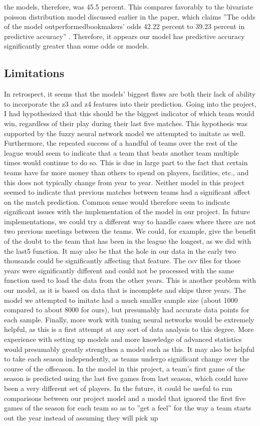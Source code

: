 \documentclass[sigconf]{acmart}
\begin{document}
the models, therefore, was 45.5 percent. This compares favorably to the bivariate poisson distribution model discussed earlier in the paper, which claims ''The odds of the model outperformedbookmakers’ odds 42.22 percent to 39.23 percent in predictive accuracy'' \cite{BivariateExpected}. Therefore, it appears our model has predictive accuracy significantly greater than some odds or models.

\subsection{Limitations}
In retrospect, it seems that the models' biggest flaws are both their lack of ability to incorporate the z3 and z4 features into their prediction. Going into the project, I had hypothesized that this should be the biggest indicator of which team would win, regardless of their play during their last five matches. This hypothesis was supported by the fuzzy neural network model we attempted to imitate as well. Furthermore, the repeated success of a handful of teams over the rest of the league would seem to indicate that a team that beats another team multiple times would continue to do so. This is due in large part to the fact that certain teams have far more money than others to spend on players, facilities, etc., and this does not typically change from year to year. Neither model in this project seemed to indicate that previous matches between teams had a significant affect on the match prediction. Common sense would therefore seem to indicate significant issues with the implementation of the model in our project. In future implementations, we could try a different way to handle cases where there are not two previous meetings between the teams. We could, for example, give the benefit of the doubt to the team that has been in the league the longest, as we did with the last5 function. It may also be that the hole in our data in the early two thousands could be significantly affecting that feature. The csv files for those years were significantly different and could not be processed with the same function used to load the data from the other years. This is another problem with our model, as it is based on data that is incomplete and skips three years. The model we attempted to imitate had a much smaller sample size (about 1000 compared to about 8000 for ours), but presumably had accurate data points for each sample. Finally, more work with tuning neural networks would be extremely helpful, as this is a first attempt at any sort of data analysis to this degree. More experience with setting up models and more knowledge of advanced statistics would presumably greatly strengthen a model such as this. It may also be helpful to take each season independently, as teams undergo significant change over the course of the offseason. In the model in this project, a team's first game of the season is predicted using the last five games from last season, which could have been a very different set of players. In the future, it could be useful to run comparisons between our project model and a model that ignored the first five games of the season for each team so as to ''get a feel'' for the way a team starts out the year instead of assuming they will pick up 
\end{document}
